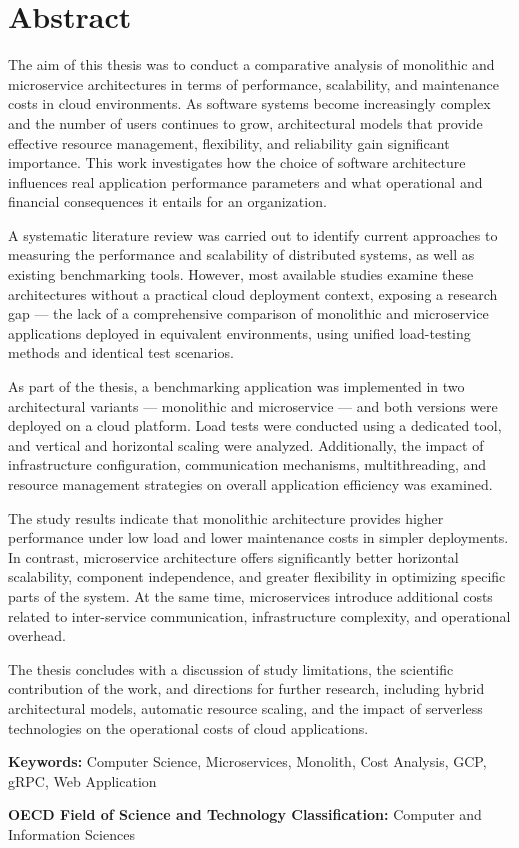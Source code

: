 \section*{Abstract}

The aim of this thesis was to conduct a comparative analysis of monolithic
and microservice architectures in terms of performance, scalability,
and maintenance costs in cloud environments. As software systems become
increasingly complex and the number of users continues to grow, architectural
models that provide effective resource management, flexibility, and reliability
gain significant importance. This work investigates how the choice of software
architecture influences real application performance parameters and what
operational and financial consequences it entails for an organization.

A systematic literature review was carried out to identify current approaches
to measuring the performance and scalability of distributed systems, as well
as existing benchmarking tools. However, most available studies examine these
architectures without a practical cloud deployment context, exposing a research
gap — the lack of a comprehensive comparison of monolithic and microservice
applications deployed in equivalent environments, using unified load-testing
methods and identical test scenarios.

As part of the thesis, a benchmarking application was implemented in two
architectural variants — monolithic and microservice — and both versions were
deployed on a cloud platform. Load tests were conducted using a dedicated tool,
and vertical and horizontal scaling were analyzed. Additionally, the impact of
infrastructure configuration, communication mechanisms, multithreading, and
resource management strategies on overall application efficiency was examined.

The study results indicate that monolithic architecture provides higher
performance under low load and lower maintenance costs in simpler deployments.
In contrast, microservice architecture offers significantly better horizontal
scalability, component independence, and greater flexibility in optimizing
specific parts of the system. At the same time, microservices introduce
additional costs related to inter-service communication, infrastructure
complexity, and operational overhead.

The thesis concludes with a discussion of study limitations, the scientific
contribution of the work, and directions for further research, including
hybrid architectural models, automatic resource scaling, and the impact of
serverless technologies on the operational costs of cloud applications.

\vspace{0.5cm}

\noindent \textbf{Keywords:} Computer Science, Microservices, Monolith, Cost Analysis, GCP, gRPC, Web Application

\vspace{0.5cm}

\noindent \textbf{OECD Field of Science and Technology Classification:} Computer and Information Sciences